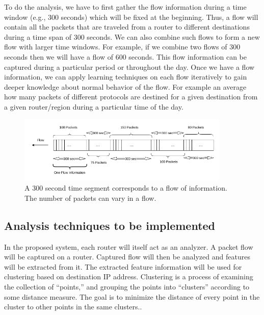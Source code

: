 \documentclass[12pt,oneside,a4paper]{article}
\begin{document}
To do the analysis, we have to first gather the flow information during a time window (e.g., 300 seconds) which will be fixed at the beginning. Thus, a flow will contain all the packets that are traveled from a router to different destinations during a time span of 300 seconds. We can also combine such flows to form a new flow with larger time windows. For example, if we combine two flows of 300 seconds then we will have a flow of 600 seconds. This flow information can be captured during a particular period or throughout the day. Once we have a flow information, we can apply learning techniques on each flow iteratively to gain deeper knowledge about normal behavior of the flow. For example an average how many packets of different protocols are destined for a given destination from a given router/region during a particular time of the day.

\begin{figure}[H]
\centering
\includegraphics[width=0.90\textwidth]{Data_Flow_Capture.png}
\caption{A 300 second time segment corresponds to a flow of information. The number of packets can vary in a flow.} \label{fig:flow}
\end{figure}

\subsection{Analysis techniques to be implemented}
In the proposed system, each router will itself act as an analyzer. A packet flow will be captured on a router. Captured flow will then be analyzed and features will be extracted from it. The extracted feature information will be used for clustering based on destination IP address. Clustering is a process of examining the collection of “points,” and grouping the points into “clusters” according to some distance measure. The goal is to minimize the distance of every point in the cluster to other points in the same clusters.\cite{machine-learning}.
\end{document}
